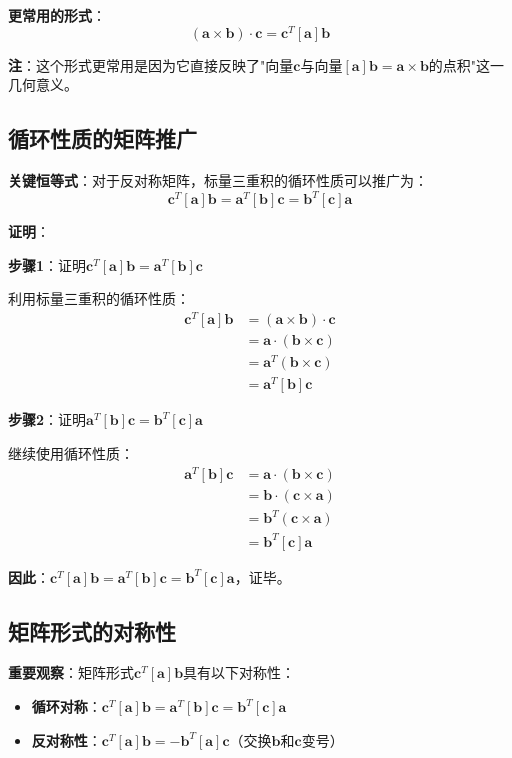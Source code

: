 \documentclass[12pt,a4paper]{article}
\begin{document}
\textbf{更常用的形式}：
\begin{equation}
(\bm{a} \times \bm{b}) \cdot \bm{c} = \bm{c}^T [\bm{a}] \bm{b}
\label{eq:matrix_form1}
\end{equation}

\textbf{注}：这个形式更常用是因为它直接反映了"向量$\bm{c}$与向量$[\bm{a}]\bm{b} = \bm{a} \times \bm{b}$的点积"这一几何意义。

\subsection{循环性质的矩阵推广}

\textbf{关键恒等式}：对于反对称矩阵，标量三重积的循环性质可以推广为：
\begin{equation}
\bm{c}^T [\bm{a}] \bm{b} = \bm{a}^T [\bm{b}] \bm{c} = \bm{b}^T [\bm{c}] \bm{a}
\label{eq:matrix_cyclic}
\end{equation}

\textbf{证明}：

\textbf{步骤1}：证明$\bm{c}^T [\bm{a}] \bm{b} = \bm{a}^T [\bm{b}] \bm{c}$

利用标量三重积的循环性质：
\begin{align}
\bm{c}^T [\bm{a}] \bm{b} &= (\bm{a} \times \bm{b}) \cdot \bm{c} \\
&= \bm{a} \cdot (\bm{b} \times \bm{c}) \\
&= \bm{a}^T (\bm{b} \times \bm{c}) \\
&= \bm{a}^T [\bm{b}] \bm{c}
\end{align}

\textbf{步骤2}：证明$\bm{a}^T [\bm{b}] \bm{c} = \bm{b}^T [\bm{c}] \bm{a}$

继续使用循环性质：
\begin{align}
\bm{a}^T [\bm{b}] \bm{c} &= \bm{a} \cdot (\bm{b} \times \bm{c}) \\
&= \bm{b} \cdot (\bm{c} \times \bm{a}) \\
&= \bm{b}^T (\bm{c} \times \bm{a}) \\
&= \bm{b}^T [\bm{c}] \bm{a}
\end{align}

\textbf{因此}：$\bm{c}^T [\bm{a}] \bm{b} = \bm{a}^T [\bm{b}] \bm{c} = \bm{b}^T [\bm{c}] \bm{a}$，证毕。

\subsection{矩阵形式的对称性}

\textbf{重要观察}：矩阵形式$\bm{c}^T [\bm{a}] \bm{b}$具有以下对称性：
\begin{itemize}
\item \textbf{循环对称}：$\bm{c}^T [\bm{a}] \bm{b} = \bm{a}^T [\bm{b}] \bm{c} = \bm{b}^T [\bm{c}] \bm{a}$
\item \textbf{反对称性}：$\bm{c}^T [\bm{a}] \bm{b} = -\bm{b}^T [\bm{a}] \bm{c}$（交换$\bm{b}$和$\bm{c}$变号）
\end{itemize}
\end{document}
